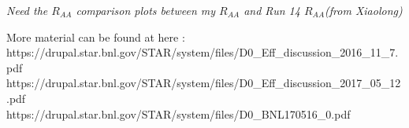 \emph{Need the $R_{AA}$ comparison plots between my $R_{AA}$  and Run 14 $R_{AA}$(from Xiaolong) }

More material can be found at here :  
\\https://drupal.star.bnl.gov/STAR/system/files/D0\_Eff\_discussion\_2016\_11\_7.pdf
\\https://drupal.star.bnl.gov/STAR/system/files/D0\_Eff\_discussion\_2017\_05\_12.pdf
\\https://drupal.star.bnl.gov/STAR/system/files/D0\_BNL170516\_0.pdf
% 



